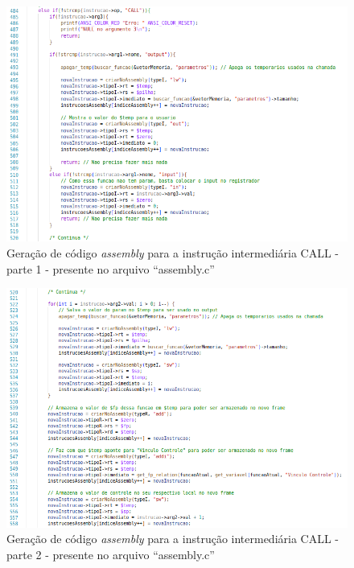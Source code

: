 \documentclass[
	12pt,				%
	oneside,
	a4paper,			%
	english,			%
	french,				%
	spanish,			%
	brazil,				%
	]{abntex2}
\begin{document}
\begin{figure}[H]
\centering 
\caption{Geração de código \emph{assembly} para a instrução intermediária CALL - parte 1 - presente no arquivo ``assembly.c''} \label{fig:AssemblyCALL1}
\graphicspath{ {./imgs/} } 
\includegraphics[scale=0.4]{imgs/Codigo/Cod_Assembly_Call1.png}
\end{figure}

\begin{figure}[H]
\centering 
\caption{Geração de código \emph{assembly} para a instrução intermediária CALL - parte 2 - presente no arquivo ``assembly.c''} \label{fig:AssemblyCALL2}
\graphicspath{ {./imgs/} } 
\includegraphics[scale=0.4]{imgs/Codigo/Cod_Assembly_Call2.png}
\end{figure}
\end{document}
